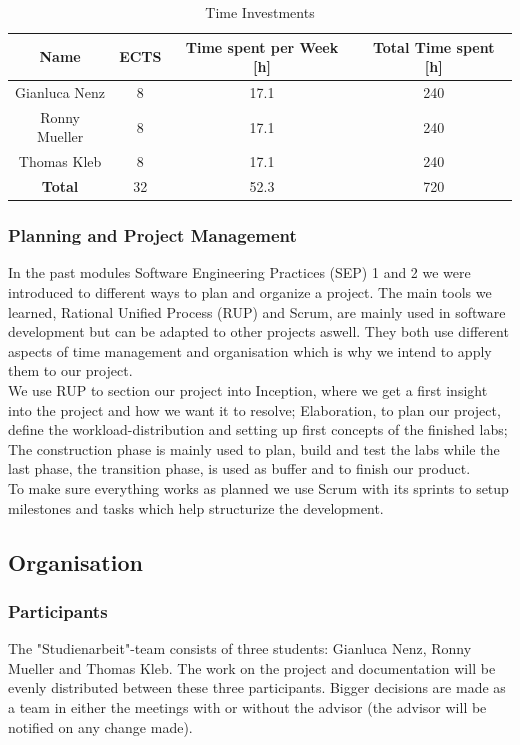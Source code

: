 \begin{table}
    \centering
    \begin{tabular}{||c c c c||} 
        \hline
        Name & ECTS & Time spent per Week [h] & Total Time spent [h]\\ [0.5ex] 
        \hline\hline
        Gianluca Nenz & 8 & 17.1 & 240 \\ 
        \hline
        Ronny Mueller & 8 & 17.1 & 240 \\
        \hline
        Thomas Kleb & 8 & 17.1 & 240 \\ 
        \hline
        \textbf{Total} & 32 & 52.3 & 720 \\[1ex] 
        \hline
    \end{tabular}
    \caption{Time Investments}
    \label{time_ects}
\end{table}

\subsubsection*{Planning and Project Management}
In the past modules Software Engineering Practices (SEP) 1 and 2  we were introduced to different ways to plan and organize a project. The main tools we learned, Rational Unified Process (RUP) and Scrum, are mainly used in software development but can be adapted to other projects aswell. They both use different aspects of time management and organisation which is why we intend to apply them to our project. \\
We use RUP to section our project into Inception, where we get a first insight into the project and how we want it to resolve; Elaboration, to plan our project, define the workload-distribution and setting up first concepts of the finished labs; The construction phase is mainly used to plan, build and test the labs while the last phase, the transition phase, is used as buffer and to finish our product. \\ 
To make sure everything works as planned we use Scrum with its sprints to setup milestones and tasks which help structurize the development. 

\subsection{Organisation}

\subsubsection*{Participants}
The "Studienarbeit"-team consists of three students: Gianluca Nenz, Ronny Muel\-ler and Thomas Kleb. The work on the project and documentation will be evenly distributed between these three participants. Bigger decisions are made as a team in either the meetings with or without the advisor (the advisor will be notified on any change made).

